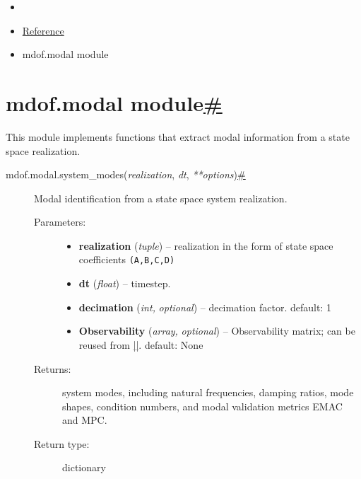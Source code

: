 \hypertarget{rtd-footer-container}{}

\hypertarget{main-content}{}
\begin{itemize}
\tightlist
\item
  \href{../index.html}{\emph{}}
\item
  \href{index.html}{Reference}
\item
  mdof.modal module
\end{itemize}

\hypertarget{searchbox}{}

\hypertarget{module-mdof.modal}{}
\protect\hypertarget{mdof-modal-module}{}{}

\hypertarget{mdof.modal-module}{%
\section{\texorpdfstring{mdof.modal
module\protect\hyperlink{module-mdof.modal}{\#}}{mdof.modal module\#}}\label{mdof.modal-module}}

This module implements functions that extract modal information from a
state space realization.

\begin{description}
\item[{ {{mdof.modal.}}{{system\_modes}}{(}\emph{{{realization}}},
\emph{{{dt}}},
\emph{{{**}}{{options}}}{)}\protect\hyperlink{mdof.modal.system_modes}{\#}}]
Modal identification from a state space system realization.

\begin{description}
\item[Parameters{:}]
\begin{itemize}
\item
  \textbf{realization} (\emph{tuple}) -- realization in the form of
  state space coefficients \texttt{(A,B,C,D)}
\item
  \textbf{dt} (\emph{float}) -- timestep.
\item
  \textbf{decimation} (\emph{int,} \emph{optional}) -- decimation
  factor. default: 1
\item
  \textbf{Observability} (\emph{array,} \emph{optional}) --
  Observability matrix; can be reused from
  \href{mdof.realize.html\#mdof.realize.srim}{\VERB||}.
  default: None
\end{itemize}
\item[Returns{:}]
system modes, including natural frequencies, damping ratios, mode
shapes, condition numbers, and modal validation metrics EMAC and MPC.
\item[Return type{:}]
dictionary
\end{description}
\end{description}

